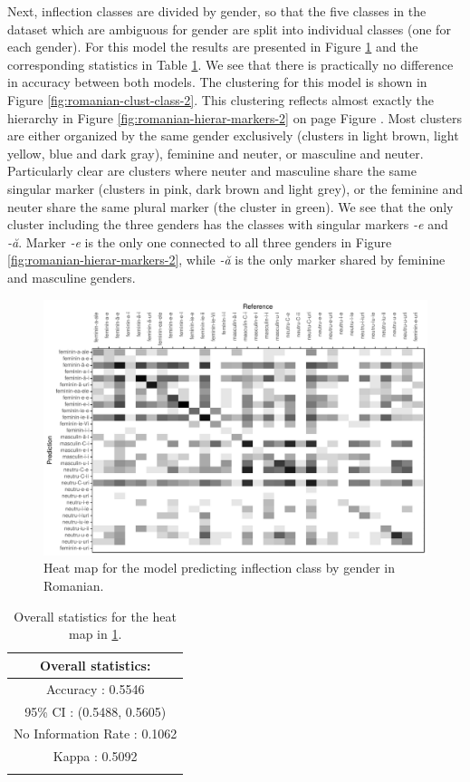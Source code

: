 Next, inflection classes are divided by gender, so that the five classes in the dataset which are ambiguous for gender are split into individual classes (one for each gender). For this model the results are presented in Figure \ref{fig:class-2-cm-romanian} and the corresponding statistics in Table \ref{tab:class-2-romanian-stats}. We see that there is practically no difference in accuracy between both models. The clustering for this model is shown in Figure \ref{fig:romanian-clust-class-2}. This clustering reflects almost exactly the hierarchy in Figure \ref{fig:romanian-hierar-markers-2} on page Figure \pageref{fig:romanian-hierar-markers-2}. Most clusters are either organized by the same gender exclusively (clusters in light brown, light yellow, blue and dark gray), feminine and neuter, or masculine and neuter. Particularly clear are clusters where neuter and masculine share the same singular marker (clusters in pink, dark brown and light grey), or the feminine and neuter share the same plural marker (the cluster in green).  We see that the only cluster including the three genders has the classes with singular markers \textit{-e} and \textit{-ă}. Marker \textit{-e} is the only one connected to all three genders in Figure \ref{fig:romanian-hierar-markers-2}, while \textit{-ă} is the only marker shared by feminine and masculine genders.

\begin{figure}[!htpb]
  \centering
  \includegraphics[width=1.0\textwidth]{./figures/romanian/class-2-cm.pdf}
  \caption{Heat map for the model predicting inflection class by gender in Romanian.}\label{fig:class-2-cm-romanian}
\end{figure}

\begin{table}[!htpb]
  \centering
  \begin{tabular}{c}
    \lsptoprule
    Overall statistics: \\
    \midrule
    Accuracy : 0.5546\\
    95\% CI : (0.5488, 0.5605)\\
    No Information Rate : 0.1062\\
    Kappa : 0.5092\\
    \lspbottomrule
  \end{tabular}
  \caption{Overall statistics for the heat map in \ref{fig:class-2-cm-romanian}.}\label{tab:class-2-romanian-stats}
\end{table}

